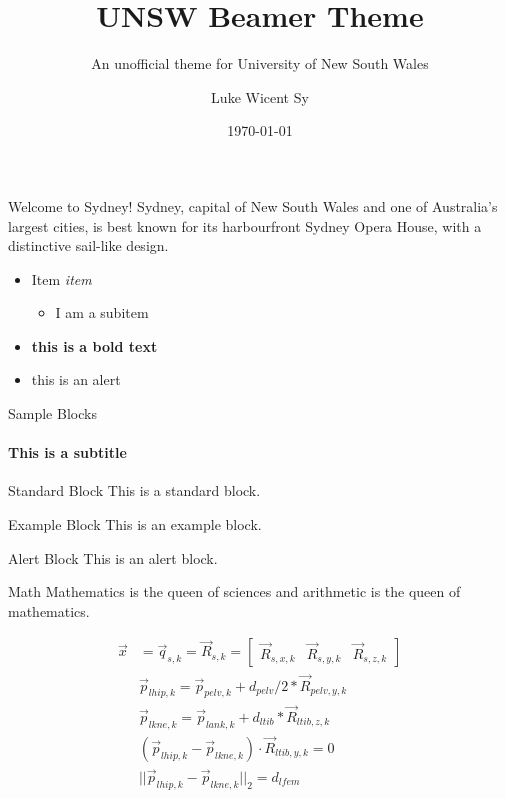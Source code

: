 \documentclass[aspectratio=169]{beamer}
\author{Luke Wicent Sy}
\title{UNSW Beamer Theme}
\subtitle{An unofficial theme for University of New South Wales}
\institute{Graduate School of Biomedical Engineering}
\date{\today}
\begin{document}
	\begin{frame}[plain]
		\titlepage
	\end{frame}
	
	\begin{frame}{Welcome to Sydney!}
	Sydney, capital of New South Wales and one of Australia's largest cities, is best known for its harbourfront Sydney Opera House, with a distinctive sail-like design.
		\begin{itemize}
			\item Item \textit{item}
				\begin{itemize}
					\item I am a subitem
				\end{itemize}
			\item \textbf{this is a bold text}
			\item \alert{this is an alert}
		\end{itemize}
	\end{frame}

	\begin{frame}{Sample Blocks}
		\framesubtitle{This is a subtitle}
		\begin{block}{Standard Block}
			This is a standard block.
		\end{block}
		
		\begin{exampleblock}{Example Block}
			This is an example block.
		\end{exampleblock}
		
		\begin{alertblock}{Alert Block}
			This is an alert block.
		\end{alertblock}
	\end{frame}
	
	\begin{frame}{Math}
		Mathematics is the queen of sciences and arithmetic is the queen of mathematics.

		\begin{align*}
			\vec{x} &= \vec{q}_{s, k} = \vec{R}_{s, k} = 
			\begin{bmatrix}
			\vec{R}_{s, x, k} & \vec{R}_{s, y, k} & \vec{R}_{s, z, k}
			\end{bmatrix} \\
			& \vec{p}_{lhip, k} = \vec{p}_{pelv, k} + d_{pelv}/2*\vec{R}_{pelv, y, k} \\
			& \vec{p}_{lkne, k} = \vec{p}_{lank, k} + d_{ltib}*\vec{R}_{ltib, z, k} \\
			& (\vec{p}_{lhip, k} - \vec{p}_{lkne, k} ) \cdot \vec{R}_{ltib, y, k} = 0\\
			& ||\vec{p}_{lhip, k} - \vec{p}_{lkne, k}||_2 = d_{lfem}
		\end{align*}	
		
		
	\end{frame}
\end{document}
